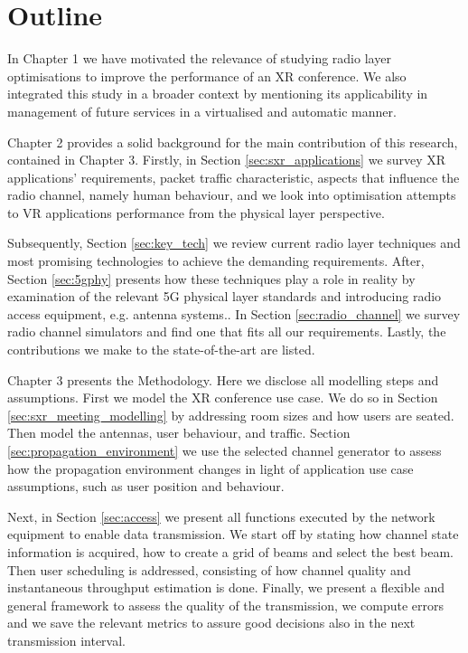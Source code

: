 \section{Outline}
\label{sec:outline}

In Chapter 1 we have motivated the relevance of studying radio layer optimisations to improve the performance of an \ac{XR} conference. We also integrated this study in a broader context by mentioning its applicability in management of future services in a virtualised and automatic manner. 

Chapter 2 provides a solid background for the main contribution of this research, contained in Chapter 3. Firstly, in Section \ref{sec:sxr_applications} we survey XR applications' requirements, packet traffic characteristic, aspects that influence the radio channel, namely human behaviour, and we look into optimisation attempts to VR applications performance from the physical layer perspective.

Subsequently, Section \ref{sec:key_tech} we review current radio layer techniques and most promising technologies to achieve the demanding requirements. After, Section \ref{sec:5gphy} presents how these techniques play a role in reality by examination of the relevant 5G physical layer standards and introducing radio access equipment, e.g. antenna systems.. In Section \ref{sec:radio_channel} we survey radio channel simulators and find one that fits all our requirements. Lastly, the contributions we make to the state-of-the-art are listed.

Chapter 3 presents the Methodology. Here we disclose all modelling steps and assumptions. First we model the XR conference use case. We do so in Section \ref{sec:sxr_meeting_modelling} by addressing room sizes and how users are seated. Then model the antennas, user behaviour, and traffic. Section \ref{sec:propagation_environment} we use the selected channel generator to assess how the propagation environment changes in light of application use case assumptions, such as user position and behaviour.

Next, in Section \ref{sec:access} we present all functions executed by the network equipment to enable data transmission. We start off by stating how channel state information is acquired, how to create a grid of beams and select the best beam. Then user scheduling is addressed, consisting of how channel quality and instantaneous throughput estimation is done. Finally, we present a flexible and general framework to assess the quality of the transmission, we compute errors and we save the relevant metrics to assure good decisions also in the next transmission interval.

